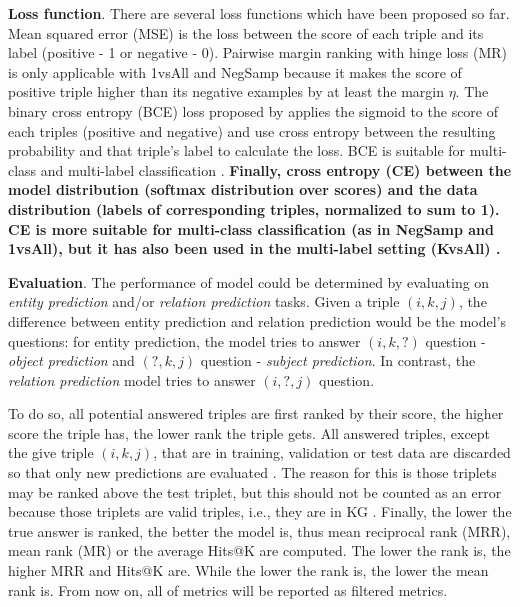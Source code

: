 \noindent\textbf{Loss function}. There are several loss functions which have been proposed so far. Mean squared error (MSE) is the loss between the score of each triple and its label (positive - 1 or negative - 0). Pairwise margin ranking with hinge loss (MR) is only applicable with 1vsAll and NegSamp because it makes the score of positive triple higher than its negative examples by at least the margin $\eta$. The binary cross entropy (BCE) loss proposed by \citet{trouillon2016complex} applies the sigmoid to the score of each triples (positive and negative) and use cross entropy between the resulting probability and that triple’s label to calculate the loss. BCE is suitable for multi-class and multi-label classification \citep{Ruffinelli2020You}. \textbf{Finally, cross entropy (CE) between the model distribution
(softmax distribution over scores) and the data distribution (labels of corresponding triples, normalized
to sum to 1). CE is more suitable for multi-class classification (as in NegSamp and 1vsAll),
but it has also been used in the multi-label setting (KvsAll) \citep{Ruffinelli2020You}.}
\newline

\noindent\textbf{Evaluation}. The performance of model could be determined by evaluating on \textit{entity prediction} and/or \textit{relation prediction} tasks. Given a triple $(i,k,j)$, the difference between entity prediction and relation prediction would be the model's questions: for entity prediction, the model tries to answer $(i,k,?)$ question - \textit{object prediction} and $(?,k,j)$ question - \textit{subject prediction}. In contrast, the \textit{relation prediction} model tries to answer $(i,?,j)$ question. 

To do so, all potential answered triples are first ranked by their score, the higher score the triple has, the lower rank the triple gets. All answered triples, except the give triple $(i,k,j)$, that are in training, validation or test data are discarded so that only new predictions are evaluated \citep{Ruffinelli2020You}. The reason for this is those triplets may be ranked above the test triplet, but this should not be counted as an error because those triplets are valid triples, i.e., they are in KG \citep{bordes2013translating}. Finally, the lower the true answer is ranked, the better the model is, thus mean reciprocal rank (MRR), mean rank (MR) or the average Hits@K are computed. The lower the rank is, the higher MRR and Hits@K are. While the lower the rank is, the lower the mean rank is. From now on, all of metrics will be reported as filtered metrics.

